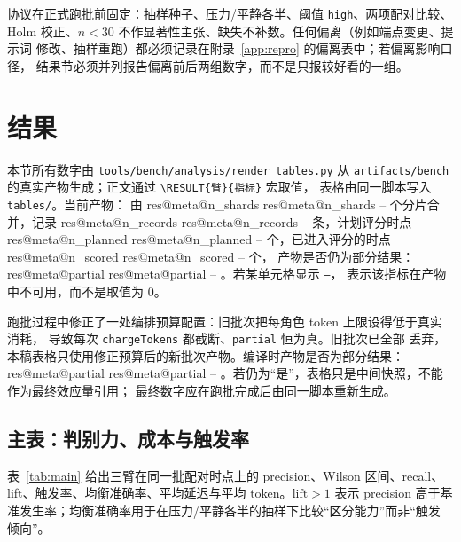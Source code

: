 \documentclass[UTF8,fontset=fandol,11pt,a4paper]{ctexart}
\makeatletter
\newcommand{\RESULT}[2]{%
  \ifcsname res@#1@#2\endcsname
    \csname res@#1@#2\endcsname
  \else
    --%
  \fi}
\makeatother
\begin{document}
协议在正式跑批前固定：抽样种子、压力/平静各半、阈值 \texttt{high}、两项配对比较、
Holm 校正、$n<30$ 不作显著性主张、缺失不补数。任何偏离（例如端点变更、提示词
修改、抽样重跑）都必须记录在附录~\ref{app:repro} 的偏离表中；若偏离影响口径，
结果节必须并列报告偏离前后两组数字，而不是只报较好看的一组。

\section{结果}
\label{sec:results}

本节所有数字由 \texttt{tools/bench/analysis/render\_tables.py} 从
\texttt{artifacts/bench} 的真实产物生成；正文通过 \verb|\RESULT{臂}{指标}| 宏取值，
表格由同一脚本写入 \texttt{tables/}。当前产物：
由 \RESULT{meta}{n_shards} 个分片合并，记录 \RESULT{meta}{n_records} 条，计划评分时点
\RESULT{meta}{n_planned} 个，已进入评分的时点 \RESULT{meta}{n_scored} 个，
产物是否仍为部分结果：\RESULT{meta}{partial}。若某单元格显示 \texttt{--}，
表示该指标在产物中不可用，而不是取值为 0。

跑批过程中修正了一处编排预算配置：旧批次把每角色 token 上限设得低于真实消耗，
导致每次 \texttt{chargeTokens} 都截断、\texttt{partial} 恒为真。旧批次已全部
丢弃，本稿表格只使用修正预算后的新批次产物。编译时产物是否为部分结果：
\RESULT{meta}{partial}。若仍为“是”，表格只是中间快照，不能作为最终效应量引用；
最终数字应在跑批完成后由同一脚本重新生成。

\subsection{主表：判别力、成本与触发率}

表~\ref{tab:main} 给出三臂在同一批配对时点上的 precision、Wilson 区间、recall、
lift、触发率、均衡准确率、平均延迟与平均 token。$\mathrm{lift}>1$ 表示 precision
高于基准发生率；均衡准确率用于在压力/平静各半的抽样下比较“区分能力”而非“触发
倾向”。
\end{document}
